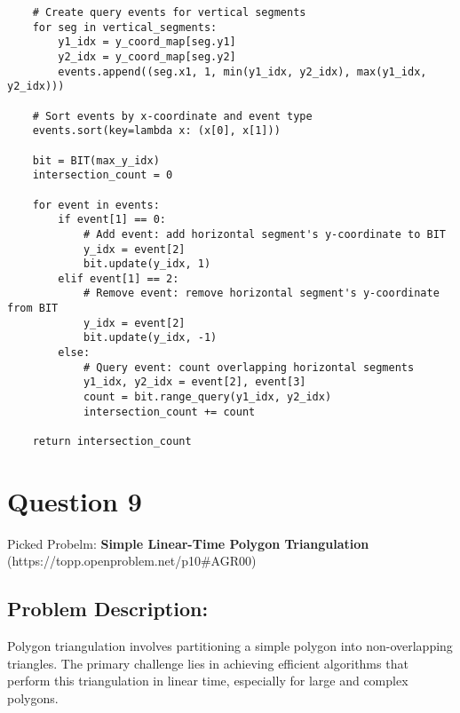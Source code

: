 \documentclass{article}
\begin{document}
\begin{verbatim}
    # Create query events for vertical segments
    for seg in vertical_segments:
        y1_idx = y_coord_map[seg.y1]
        y2_idx = y_coord_map[seg.y2]
        events.append((seg.x1, 1, min(y1_idx, y2_idx), max(y1_idx, y2_idx)))

    # Sort events by x-coordinate and event type
    events.sort(key=lambda x: (x[0], x[1]))

    bit = BIT(max_y_idx)
    intersection_count = 0

    for event in events:
        if event[1] == 0:
            # Add event: add horizontal segment's y-coordinate to BIT
            y_idx = event[2]
            bit.update(y_idx, 1)
        elif event[1] == 2:
            # Remove event: remove horizontal segment's y-coordinate from BIT
            y_idx = event[2]
            bit.update(y_idx, -1)
        else:
            # Query event: count overlapping horizontal segments
            y1_idx, y2_idx = event[2], event[3]
            count = bit.range_query(y1_idx, y2_idx)
            intersection_count += count

    return intersection_count
\end{verbatim}

\newpage

\section*{Question 9}
Picked Probelm: \textbf{Simple Linear-Time Polygon Triangulation} 
\\
(https://topp.openproblem.net/p10#AGR00)

\subsection*{Problem Description:}
Polygon triangulation involves partitioning a simple polygon into non-overlapping triangles.
The primary challenge lies in achieving efficient algorithms that perform this triangulation in linear time, especially for large and complex polygons.
\end{document}
